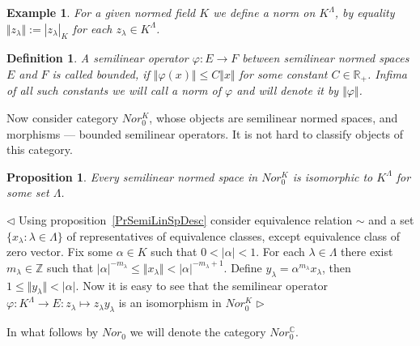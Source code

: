 \documentclass[12pt]{article}
\newtheorem{proposition}[theorem]{Proposition}
\newtheorem{definition}[theorem]{Definition}
\newtheorem{example}[theorem]{Example}
\newenvironment{proof}{\par $\triangleleft$}{$\triangleright$}
\begin{document}
\begin{example}\label{ExSemiLinNorModelSp}
For a given normed field $K$ we define a norm on $K^{\Lambda}$, by equality 
$\Vert z_\lambda\Vert:=|z_\lambda|_K$ for each $z_\lambda\in K^\Lambda$. 
\end{example}

\begin{definition}\label{DefSemiLinBndOp} A semilinear operator 
$\varphi : E \to F$ between semilinear normed spaces $E$ and $F$ is called 
bounded, if $\Vert \varphi (x)\Vert \leq C \Vert x \Vert$ for  some 
constant $C\in\mathbb{R}_+$. Infima of all such constants we will call a 
norm of $\varphi$ and will denote it by $\Vert\varphi\Vert$.
\end{definition}

Now consider category $Nor_0^K$, whose objects are semilinear normed spaces, 
and morphisms --- bounded semilinear operators. It is not hard to classify 
objects of this category.

\begin{proposition}\label{PrSemiLinNorSpDesc} Every semilinear normed space in 
$Nor_0^K$ is isomorphic to $K^{\Lambda}$ for some set $\Lambda$.
\end{proposition}

\begin{proof} Using proposition~\ref{PrSemiLinSpDesc} consider equivalence 
relation $\sim$ and a set $ \{x_\lambda:\lambda\in\Lambda \}$ of representatives 
of equivalence classes, except equivalence class of zero vector. 
Fix some $\alpha\in K$ such that $0<|\alpha|<1$. For each $\lambda\in\Lambda$ 
there exist $m_\lambda\in\mathbb{Z}$ such that 
$|\alpha|^{-m_\lambda}\leq\Vert x_\lambda\Vert< |\alpha|^{-m_\lambda+1}$. 
Define $y_\lambda=\alpha^{m_\lambda} x_\lambda$, 
then $1\leq \Vert y_\lambda\Vert<|\alpha|$. Now it is easy to see that the 
semilinear operator 
$\varphi: K^\Lambda\to E: z_\lambda\mapsto z_\lambda y_\lambda$ is 
an isomorphism in $Nor_0^K$
\end{proof}

In what follows by $Nor_0$ we will denote the category $Nor_0^\mathbb{C}$.
\end{document}
